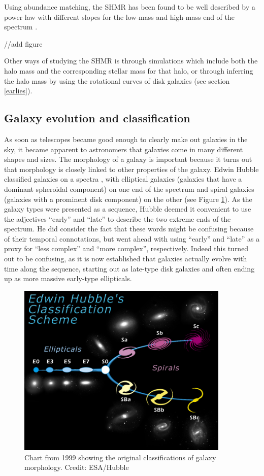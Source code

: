 Using abundance matching, the SHMR has been found to be well described by a power law with different slopes for the low-mass and high-mass end of the spectrum \parencite{Behroozi2013}. 

//add figure

Other ways of studying the SHMR is through simulations which include both the halo mass and the corresponding stellar mass for that halo, or through inferring the halo mass by using the rotational curves of disk galaxies (see section \ref{earlies}).

\subsection{Galaxy evolution and classification}

As soon as telescopes became good enough to clearly make out galaxies in the sky, it became apparent to astronomers that galaxies come in many different shapes and sizes. The morphology of a galaxy is important because it turns out that morphology is closely linked to other properties of the galaxy. Edwin Hubble classified galaxies on a spectra \parencite{Hubble1926}, with elliptical galaxies (galaxies that have a dominant spheroidal component) on one end of the spectrum and spiral galaxies (galaxies with a prominent disk component) on the other (see Figure \ref{hubble}). As the galaxy types were presented as a sequence, Hubble deemed it convenient to use the adjectives ``early'' and ``late'' to describe the two extreme ends of the spectrum. He did consider the fact that these words might be confusing because of their temporal connotations, but went ahead with using ``early'' and ``late'' as a proxy for ``less complex'' and ``more complex'', respectively. Indeed this turned out to be confusing, as it is now established that galaxies actually evolve with time along the sequence, starting out as late-type disk galaxies and often ending up as more massive early-type ellipticals.

\begin{figure}
    \centering
    \includegraphics[width=0.9\textwidth]{images/hubble.jpg}
    \caption{Chart from 1999 showing the original classifications of galaxy morphology. Credit: ESA/Hubble}
    \label{hubble}
\end{figure}

